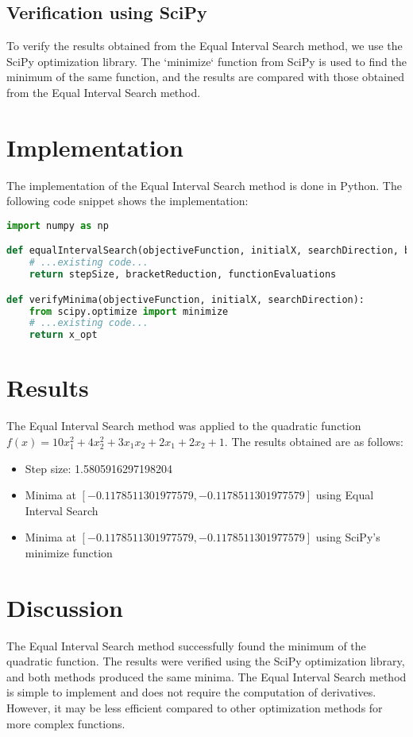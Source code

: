 \documentclass[11pt]{article}
\begin{document}
\subsection{Verification using SciPy}
To verify the results obtained from the Equal Interval Search method, we use the SciPy optimization library. The `minimize` function from SciPy is used to find the minimum of the same function, and the results are compared with those obtained from the Equal Interval Search method.

\section{Implementation}
The implementation of the Equal Interval Search method is done in Python. The following code snippet shows the implementation:
\begin{lstlisting}[language=Python]
import numpy as np

def equalIntervalSearch(objectiveFunction, initialX, searchDirection, bracket, numIntervals):
    # ...existing code...
    return stepSize, bracketReduction, functionEvaluations

def verifyMinima(objectiveFunction, initialX, searchDirection):
    from scipy.optimize import minimize
    # ...existing code...
    return x_opt
\end{lstlisting}

\section{Results}
The Equal Interval Search method was applied to the quadratic function \(f(x) = 10x_1^2 + 4x_2^2 + 3x_1x_2 + 2x_1 + 2x_2 + 1\). The results obtained are as follows:
\begin{itemize}
    \item Step size: 1.5805916297198204
    \item Minima at \([-0.1178511301977579, -0.1178511301977579]\) using Equal Interval Search
    \item Minima at \([-0.1178511301977579, -0.1178511301977579]\) using SciPy's minimize function
\end{itemize}

\section{Discussion}
The Equal Interval Search method successfully found the minimum of the quadratic function. The results were verified using the SciPy optimization library, and both methods produced the same minima. The Equal Interval Search method is simple to implement and does not require the computation of derivatives. However, it may be less efficient compared to other optimization methods for more complex functions.
\end{document}
